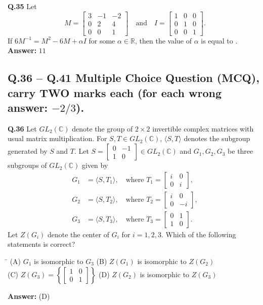 \documentclass[11pt,a4paper]{article}
\newcommand{\optsfourA}[4]{%
  \begin{tabbing}
    \hspace{0.48\linewidth}\=\kill
    (A) #1 \> (B) #2 \\[2pt]
    (C) #3 \> (D) #4
  \end{tabbing}%
}
\newcommand{\ans}[1]{\textbf{Answer:} #1\par\medskip}
\begin{document}
\textbf{Q.35} Let
\[
  M = \begin{bmatrix} 3 & -1 & -2 \\ 0 & 2 & 4 \\ 0 & 0 & 1 \end{bmatrix} \quad \text{and} \quad I = \begin{bmatrix} 1 & 0 & 0 \\ 0 & 1 & 0 \\ 0 & 0 & 1 \end{bmatrix}.
\]
If $6M^{-1} = M^2 - 6M + \alpha I$ for some $\alpha \in \mathbb{R}$, then the value of $\alpha$ is equal to \underline{\hspace{2cm}}.
\ans{$11$}

\subsection*{Q.36 -- Q.41 Multiple Choice Question (MCQ), carry TWO marks each (for each wrong answer: $-2/3$).}

\textbf{Q.36} Let $GL_2(\mathbb{C})$ denote the group of $2 \times 2$ invertible complex matrices with usual matrix multiplication. For $S, T \in GL_2(\mathbb{C})$, $\langle S, T \rangle$ denotes the subgroup generated by $S$ and $T$. Let $S = \begin{bmatrix} 0 & -1 \\ 1 & 0 \end{bmatrix} \in GL_2(\mathbb{C})$ and $G_1, G_2, G_3$ be three subgroups of $GL_2(\mathbb{C})$ given by
\begin{align*}
  G_1 &= \langle S, T_1 \rangle, \quad \text{where } T_1 = \begin{bmatrix} i & 0 \\ 0 & i \end{bmatrix}, \\
  G_2 &= \langle S, T_2 \rangle, \quad \text{where } T_2 = \begin{bmatrix} i & 0 \\ 0 & -i \end{bmatrix}, \\
  G_3 &= \langle S, T_3 \rangle, \quad \text{where } T_3 = \begin{bmatrix} 0 & 1 \\ 1 & 0 \end{bmatrix}.
\end{align*}
Let $Z(G_i)$ denote the center of $G_i$ for $i = 1, 2, 3$. Which of the following statements is correct?
\optsfourA{$G_1$ is isomorphic to $G_3$}{$Z(G_1)$ is isomorphic to $Z(G_2)$}{$Z(G_3) = \left\{\begin{bmatrix} 1 & 0 \\ 0 & 1 \end{bmatrix}\right\}$}{$Z(G_2)$ is isomorphic to $Z(G_3)$}
\ans{(D)}
\end{document}
